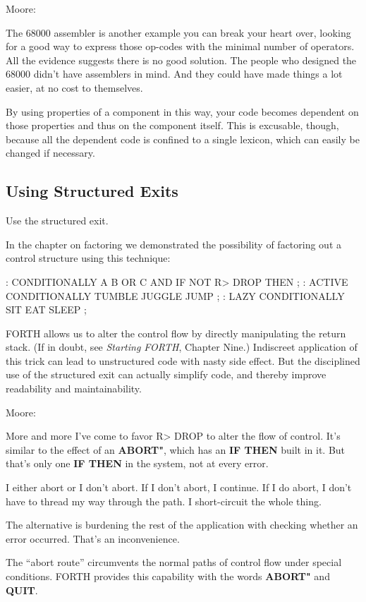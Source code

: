 \bigskip\blackline{2ex}
\noindent Moore:
\begin{tfquot}
The 68000 assembler is another example you can break your heart over,
looking for a good way to express those op-codes with the minimal number
of operators. All the evidence suggests there is no good solution. The people
who designed the 68000 didn't have assemblers in mind. And they could
have made things a lot easier, at no cost to themselves.
\end{tfquot}\blackline{1ex}
By using properties of a component in this way, your code becomes
dependent on those properties and thus on the component itself. This is
excusable, though, because all the dependent code is confined to a single
lexicon, which can easily be changed if necessary.

\subsection{Using Structured Exits}

\begin{tip}
Use the structured exit.
\end{tip}
In the chapter on factoring we demonstrated the possibility of factoring
out a control structure using this technique:

\begin{Code}
: CONDITIONALLY   A B OR  C AND  IF  NOT R> DROP  THEN ;
: ACTIVE   CONDITIONALLY   TUMBLE JUGGLE JUMP ;
: LAZY   CONDITIONALLY  SIT  EAT  SLEEP ;
\end{Code}
FORTH allows us to alter the control flow by directly manipulating the
return stack. (If in doubt, see \emph{Starting FORTH}, Chapter Nine.)
Indiscreet application of this trick can lead to unstructured code with nasty
side effect. But the disciplined use of the structured exit can actually
simplify code, and thereby improve readability and maintainability.

\bigskip\blackline{2ex}
\noindent Moore:
\begin{tfquot}
More and more I've come to favor R> DROP to alter the flow of control.
It's similar to the effect of an \textbf{ABORT"}, which has an \textbf{IF THEN}
built in it. But that's only one \textbf{IF THEN} in the system, not at every
error.

I either abort or I don't abort. If I don't abort, I continue. If I do abort, I
don't have to thread my way through the path. I short-circuit the whole
thing.

The alternative is burdening the rest of the application with checking
whether an error occurred. That's an inconvenience.
\end{tfquot}\blackline{1ex}
The ``abort route'' circumvents the normal paths of control flow under
special conditions. FORTH provides this capability with the words
\textbf{ABORT"} and \textbf{QUIT}.

